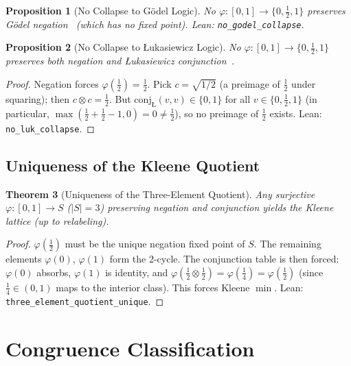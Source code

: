 \documentclass[11pt,a4paper]{article}
\newtheorem{theorem}{Theorem}[section]
\newtheorem{proposition}[theorem]{Proposition}
\newcommand{\conjc}{\otimes}
\begin{document}
\begin{proposition}[No Collapse to G\"odel Logic]
\label{prop:no-godel}
No $\varphi : [0,1] \to \{0, \tfrac{1}{2}, 1\}$ preserves G\"odel
negation~\cite{godel1932} (which has no fixed point).
Lean: \texttt{no\_godel\_collapse}.
\end{proposition}

\begin{proposition}[No Collapse to \L ukasiewicz Logic]
\label{prop:no-luk}
No $\varphi : [0,1] \to \{0, \tfrac{1}{2}, 1\}$ preserves both negation
and \L ukasiewicz conjunction~\cite{lukasiewicz1920}.
\end{proposition}
\begin{proof}
Negation forces $\varphi(\tfrac{1}{2}) = \tfrac{1}{2}$.
Pick $c = \sqrt{1/2}$ (a preimage of $\tfrac{1}{2}$ under squaring);
then $c \conjc c = \tfrac{1}{2}$.
But $\mathrm{conj}_{\text{\L}}(v,v) \in \{0, 1\}$ for all
$v \in \{0, \tfrac{1}{2}, 1\}$ (in particular,
$\max(\tfrac{1}{2} + \tfrac{1}{2} - 1, 0) = 0 \neq \tfrac{1}{2}$),
so no preimage of $\tfrac{1}{2}$ exists.
Lean: \texttt{no\_luk\_collapse}.
\end{proof}

\subsection{Uniqueness of the Kleene Quotient}

\begin{theorem}[Uniqueness of the Three-Element Quotient]
\label{thm:quotient-unique}
Any surjective $\varphi : [0,1] \to S$ ($|S|=3$) preserving negation
and conjunction yields the Kleene lattice (up to relabeling).
\end{theorem}
\begin{proof}
$\varphi(\tfrac{1}{2})$ must be the unique negation fixed point of $S$.
The remaining elements $\varphi(0)$, $\varphi(1)$ form the 2-cycle.
The conjunction table is then forced: $\varphi(0)$ absorbs, $\varphi(1)$
is identity,
and $\varphi(\tfrac{1}{2} \conjc \tfrac{1}{2}) =
\varphi(\tfrac{1}{4}) = \varphi(\tfrac{1}{2})$
(since $\tfrac{1}{4} \in (0,1)$ maps to the interior class).
This forces Kleene $\min$.
Lean: \texttt{three\_element\_quotient\_unique}.
\end{proof}

\section{Congruence Classification}
\label{sec:congruence}
\end{document}

